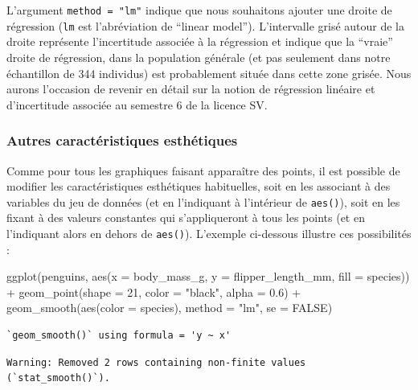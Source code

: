 \documentclass[
  a4paper,
  DIV=11,
  numbers=noendperiod,
  oneside]{scrreprt}
\newenvironment{Shaded}{}{}
\newcommand{\AttributeTok}[1]{\textcolor[rgb]{0.84,0.23,0.29}{#1}}
\newcommand{\ConstantTok}[1]{\textcolor[rgb]{0.00,0.36,0.77}{#1}}
\newcommand{\DecValTok}[1]{\textcolor[rgb]{0.00,0.36,0.77}{#1}}
\newcommand{\FloatTok}[1]{\textcolor[rgb]{0.00,0.36,0.77}{#1}}
\newcommand{\FunctionTok}[1]{\textcolor[rgb]{0.44,0.26,0.76}{#1}}
\newcommand{\NormalTok}[1]{\textcolor[rgb]{0.14,0.16,0.18}{#1}}
\newcommand{\SpecialCharTok}[1]{\textcolor[rgb]{0.00,0.36,0.77}{#1}}
\newcommand{\StringTok}[1]{\textcolor[rgb]{0.01,0.18,0.38}{#1}}
\begin{document}
L'argument \texttt{method\ =\ "lm"} indique que nous souhaitons ajouter
une droite de régression (\texttt{lm} est l'abréviation de ``linear
model''). L'intervalle grisé autour de la droite représente
l'incertitude associée à la régression et indique que la ``vraie''
droite de régression, dans la population générale (et pas seulement dans
notre échantillon de 344 individus) est probablement située dans cette
zone grisée. Nous aurons l'occasion de revenir en détail sur la notion
de régression linéaire et d'incertitude associée au semestre 6 de la
licence SV.

\subsubsection{Autres caractéristiques
esthétiques}\label{autres-caractuxe9ristiques-esthuxe9tiques}

Comme pour tous les graphiques faisant apparaître des points, il est
possible de modifier les caractéristiques esthétiques habituelles, soit
en les associant à des variables du jeu de données (et en l'indiquant à
l'intérieur de \texttt{aes()}), soit en les fixant à des valeurs
constantes qui s'appliqueront à tous les points (et en l'indiquant alors
en dehors de \texttt{aes()}). L'exemple ci-dessous illustre ces
possibilités :

\begin{Shaded}
\begin{Highlighting}[]
\FunctionTok{ggplot}\NormalTok{(penguins, }\FunctionTok{aes}\NormalTok{(}\AttributeTok{x =}\NormalTok{ body\_mass\_g, }\AttributeTok{y =}\NormalTok{ flipper\_length\_mm, }\AttributeTok{fill =}\NormalTok{ species)) }\SpecialCharTok{+}
  \FunctionTok{geom\_point}\NormalTok{(}\AttributeTok{shape =} \DecValTok{21}\NormalTok{, }\AttributeTok{color =} \StringTok{"black"}\NormalTok{, }\AttributeTok{alpha =} \FloatTok{0.6}\NormalTok{) }\SpecialCharTok{+}
  \FunctionTok{geom\_smooth}\NormalTok{(}\FunctionTok{aes}\NormalTok{(}\AttributeTok{color =}\NormalTok{ species), }\AttributeTok{method =} \StringTok{"lm"}\NormalTok{, }\AttributeTok{se =} \ConstantTok{FALSE}\NormalTok{)}
\end{Highlighting}
\end{Shaded}

\begin{verbatim}
`geom_smooth()` using formula = 'y ~ x'
\end{verbatim}

\begin{verbatim}
Warning: Removed 2 rows containing non-finite values (`stat_smooth()`).
\end{verbatim}
\end{document}
